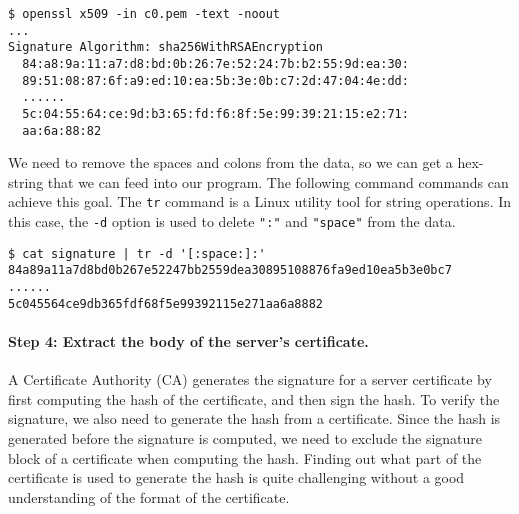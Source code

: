 \begin{lstlisting}
$ openssl x509 -in c0.pem -text -noout
...
Signature Algorithm: sha256WithRSAEncryption
  84:a8:9a:11:a7:d8:bd:0b:26:7e:52:24:7b:b2:55:9d:ea:30:
  89:51:08:87:6f:a9:ed:10:ea:5b:3e:0b:c7:2d:47:04:4e:dd:
  ......
  5c:04:55:64:ce:9d:b3:65:fd:f6:8f:5e:99:39:21:15:e2:71:
  aa:6a:88:82
\end{lstlisting}

We need to remove the spaces and colons from the data, so we can get
a hex-string that we can feed into our program. The following command
commands can achieve this goal. The \texttt{tr} command is a Linux utility tool for
string operations. In this case, the \texttt{-d} option is used to delete \texttt{":"} and
\texttt{"space"} from the data.

\begin{lstlisting}
$ cat signature | tr -d '[:space:]:'
84a89a11a7d8bd0b267e52247bb2559dea30895108876fa9ed10ea5b3e0bc7
......
5c045564ce9db365fdf68f5e99392115e271aa6a8882
\end{lstlisting}



\begin{comment}
\begin{lstlisting}
$ openssl x509 -in Chase.crt -text -noout -certopt ca_default
               -certopt no_validity -certopt no_serial
	       -certopt no_subject -certopt no_extensions
	       -certopt no_signame | grep -v 'Signature Algorithm'
	                           | tr -d '[:space:]:'
\end{lstlisting}
\end{comment}



\paragraph{Step 4: Extract the body of the server's certificate.}
A Certificate Authority (CA) generates the signature for a server certificate by first
computing the hash of the certificate, and then sign the hash. To
verify the signature, we also need to generate the hash from a
certificate. Since the hash is generated before the signature is computed,
we need to exclude the signature block of a certificate when computing the
hash. Finding out what part of the certificate is used to
generate the hash is quite challenging without a good understanding
of the format of the certificate.




